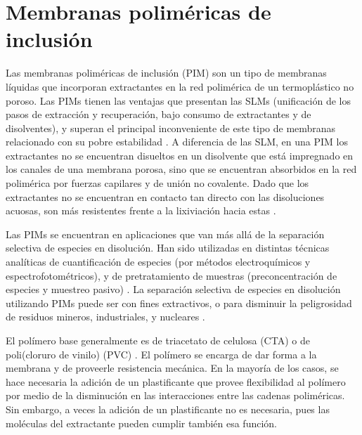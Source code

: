 
\section{Membranas poliméricas de inclusión}\label{sec:pimint}
Las membranas poliméricas de inclusión (PIM) son un tipo de membranas líquidas que incorporan extractantes en la red polimérica de un termoplástico no poroso. Las \ac{PIM}s tienen las ventajas que presentan las \ac{SLM}s (unificación de los pasos de extracción y recuperación, bajo consumo de extractantes y de disolventes), y superan el principal inconveniente de este tipo de membranas relacionado con su pobre estabilidad \citep{Nghiem2006}. A diferencia de las SLM, en una PIM los extractantes no se encuentran disueltos en un disolvente que está impregnado en los canales de una membrana porosa, sino que se encuentran absorbidos en la red polimérica por fuerzas capilares y de unión no covalente. Dado que los extractantes no se encuentran en contacto tan directo con las disoluciones acuosas, son más resistentes frente a la lixiviación hacia estas . 

Las \ac{PIM}s se encuentran en aplicaciones que van más allá de la separación selectiva de especies en disolución. Han sido utilizadas en distintas técnicas analíticas de cuantificación de especies (por métodos electroquímicos y espectrofotométricos), y de pretratamiento de muestras (preconcentración de especies y muestreo pasivo) \citep{ALMEIDA2017}. La separación selectiva de especies en disolución utilizando PIMs puede ser con fines extractivos, o para disminuir la peligrosidad de residuos mineros, industriales, y nucleares \citep{Kolev2019}.

El polímero base generalmente es de triacetato de celulosa (CTA)  o de poli(cloruro de vinilo) (PVC) . El polímero se encarga de dar forma a la membrana y de proveerle resistencia mecánica. En la mayoría de los casos, se hace necesaria la adición de un plastificante que provee flexibilidad al polímero por medio de la disminución en las interacciones entre las cadenas poliméricas. Sin embargo, a veces la adición de un plastificante no es necesaria, pues las moléculas del extractante pueden cumplir también esa función. 

    
